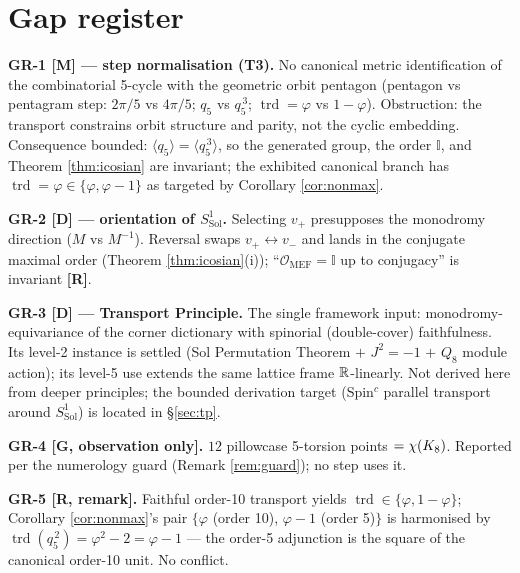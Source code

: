 \documentclass[11pt,a4paper]{article}
\theoremstyle{plain}
\theoremstyle{definition}
\theoremstyle{remark}
\newcommand{\Ico}{\mathbb{I}}
\newcommand{\OrderMEF}{\mathcal{O}_{\mathrm{MEF}}}
\newcommand{\rtag}[1]{\textnormal{\textbf{[#1]}}}
\DeclareMathOperator{\trd}{trd}
\begin{document}
\section{Gap register}\label{sec:gaps}

\begin{gapbox}
\textbf{GR-1 \rtag{M} --- step normalisation (T3).} No canonical metric identification of the combinatorial 5-cycle with the geometric orbit pentagon (pentagon vs pentagram step: $2\pi/5$ vs $4\pi/5$; $q_5$ vs $q_5^{\,3}$; $\trd = \varphi$ vs $1-\varphi$). Obstruction: the transport constrains orbit structure and parity, not the cyclic embedding. Consequence bounded: $\langle q_5\rangle = \langle q_5^{\,3}\rangle$, so the generated group, the order $\Ico$, and Theorem \ref{thm:icosian} are invariant; the exhibited canonical branch has $\trd = \varphi \in \{\varphi, \varphi - 1\}$ as targeted by Corollary \ref{cor:nonmax}.

\smallskip
\textbf{GR-2 \rtag{D} --- orientation of $S^1_{\mathrm{Sol}}$.} Selecting $v_+$ presupposes the monodromy direction ($M$ vs $M^{-1}$). Reversal swaps $v_+ \leftrightarrow v_-$ and lands in the conjugate maximal order (Theorem \ref{thm:icosian}(i)); ``$\OrderMEF = \Ico$ up to conjugacy'' is invariant \rtag{R}.

\smallskip
\textbf{GR-3 \rtag{D} --- Transport Principle.} The single framework input: monodromy-equivariance of the corner dictionary with spinorial (double-cover) faithfulness. Its level-2 instance is settled (Sol Permutation Theorem $+$ $J^2 = -1$ $+$ $Q_8$ module action); its level-5 use extends the same lattice frame $\mathbb{R}$-linearly. Not derived here from deeper principles; the bounded derivation target (Spin$^c$ parallel transport around $S^1_{\mathrm{Sol}}$) is located in \S\ref{sec:tp}.

\smallskip
\textbf{GR-4 \rtag{G, observation only}.} $12$ pillowcase 5-torsion points $= \chi(K_8)$. Reported per the numerology guard (Remark \ref{rem:guard}); no step uses it.

\smallskip
\textbf{GR-5 \rtag{R, remark}.} Faithful order-10 transport yields $\trd \in \{\varphi, 1-\varphi\}$; Corollary \ref{cor:nonmax}'s pair $\{\varphi$ (order 10), $\varphi - 1$ (order 5)$\}$ is harmonised by $\trd(q_5^{\,2}) = \varphi^2 - 2 = \varphi - 1$ --- the order-5 adjunction is the square of the canonical order-10 unit. No conflict.


\end{gapbox}
\end{document}
